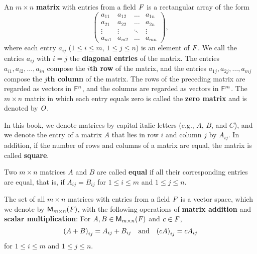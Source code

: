 \begin{defn}\label{1.2.6}
	An \(m \times n\) \textbf{matrix} with entries from a field \(\mathit{F}\) is a rectangular array of the form
	\[
		\begin{pmatrix}
			a_{1 1} & a_{1 2} & \dots  & a_{1 n} \\
			a_{2 1} & a_{2 2} & \dots  & a_{2 n} \\
			\vdots  & \vdots  & \ddots & \vdots  \\
			a_{m 1} & a_{m 2} & \dots  & a_{m n}
		\end{pmatrix},
	\]
	where each entry \(a_{i j}\) (\(1 \leq i \leq m\), \(1 \leq j \leq n\)) is an element of \(\mathit{F}\).
	We call the entries \(a_{i j}\) with \(i = j\) the \textbf{diagonal entries} of the matrix.
	The entries \(a_{i 1} ,a_{i 2} , \dots, a_{i n}\) compose the \textbf{\(i\)th row} of the matrix, and the entries \(a_{1 j}, a_{2 j}, \dots, a_{m j}\) compose the \textbf{\(j\)th column} of the matrix.
	The rows of the preceding matrix are regarded as vectors in \(\mathsf{F}^{n}\), and the columns are regarded as vectors in \(\mathsf{F}^{m}\).
	The \(m \times n\) matrix in which each entry equals zero is called the \textbf{zero matrix} and is denoted by \(\mathit{O}\).
\end{defn}

\begin{defn}\label{1.2.7}
	In this book, we denote matrices by capital italic letters (e.g., \(A\), \(B\), and \(C\)), and we denote the entry of a matrix \(A\) that lies in row \(i\) and column \(j\) by \(A_{i j}\).
	In addition, if the number of rows and columns of a matrix are equal, the matrix is called \textbf{square}.
\end{defn}

\begin{defn}\label{1.2.8}
	Two \(m \times n\) matrices \(A\) and \(B\) are called \textbf{equal} if all their corresponding entries are equal, that is, if \(A_{i j} = B_{i j}\) for \(1 \leq i \leq m\) and \(1 \leq j \leq n\).
\end{defn}

\begin{eg}\label{1.2.9}
	The set of all \(m \times n\) matrices with entries from a field \(\mathit{F}\) is a vector space, which we denote by \(\mathsf{M}_{{m} \times n}({\mathit{F}})\), with the following operations of \textbf{matrix addition} and \textbf{scalar multiplication}:
	For \(A, B \in \mathsf{M}_{{m} \times n}({\mathit{F}})\) and \(c \in \mathit{F}\),
	\[
		\p{A + B}_{i j} = A_{i j} + B_{i j} \quad \text{and} \quad \p{c A}_{i j} = c A_{i j}
	\]
	for \(1 \leq i \leq m\) and \(1 \leq j \leq n\).
\end{eg}

